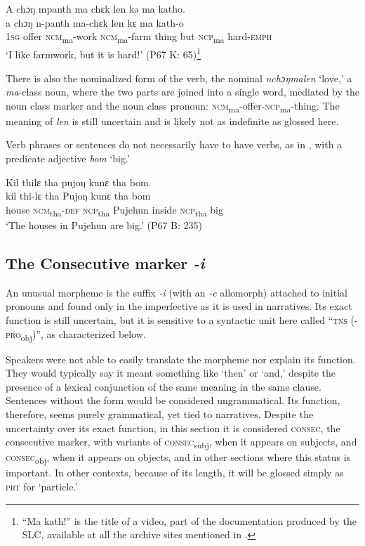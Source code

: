     \ex A chɔŋ mpanth ma chɛk len kə ma katho.\\
    \gll a    chɔŋ  n-panth      ma-chɛk      len    kɛ    ma    kath-o\\
    \textsc{1sg}  offer  \textsc{ncm}\textsubscript{ma}{}-work  \textsc{ncm}\textsubscript{ma}{}-farm  thing    but  \textsc{ncp}\textsubscript{ma}    hard-\textsc{emph}\\
    \glt ‘I like farmwork, but it is hard!' (P67 K: 65)\footnote{“Ma kath!” is the title of a video, part of the documentation produced by the SLC, available at all the archive sites mentioned in .}
\z
\z

There is also the nominalized form of the verb, the nominal \textit{nchɔŋmalen} ‘love,' a \textit{ma}{}-class noun, where the two parts are joined into a single word, mediated by the noun class marker and the noun class pronoun: \textsc{ncm}\textsubscript{ma}{}-offer-\textsc{ncp}\textsubscript{ma}{}-thing. The meaning of \textit{len} is still uncertain and is likely not as indefinite as glossed here.

Verb phrases or sentences do not necessarily have to have verbs, as in , with a predicate adjective \textit{bom} ‘big.'

\ea%
    \label{ex:202}
    Kil thilɛ tha pujoŋ kunɛ tha bom.\\
    \gll kil      thi-lɛ      tha    Pujoŋ    kunɛ    tha    bom\\
    house    \textsc{ncm}\textsubscript{tha}{}-\textsc{def}  \textsc{ncp}\textsubscript{tha}    Pujehun  inside    \textsc{ncp}\textsubscript{tha}    big\\
    \glt ‘The houses in Pujehun are big.' (P67 B: 235)
\z

\subsection{The Consecutive marker \textit{-i}}
\label{sec:8.2.1}\hypertarget{Toc115517815}{}
An unusual morpheme is the suffix \textit{{}-i} (with an \textit{{}-e} allomorph) attached to initial pronouns and found only in the imperfective as it is used in narratives. Its exact function is still uncertain, but it is sensitive to a syntactic unit here called “\textsc{tns} (\nobreakdash-\textsc{pro}\textsubscript{obj})”, as characterized below.

Speakers were not able to easily translate the morpheme nor explain its function. They would typically say it meant something like ‘then' or ‘and,' despite the presence of a lexical conjunction of the same meaning in the same clause. Sentences without the form would be considered ungrammatical. Its function, therefore, seems purely grammatical, yet tied to narratives. Despite the uncertainty over its exact function, in this section it is considered \textsc{consec}, the consecutive marker, with variants of \textsc{consec}\textsubscript{subj}, when it appears on subjects, and \textsc{consec}\textsubscript{obj}, when it appears on objects, and in other sections where this status is important. In other contexts, because of its length, it will be glossed simply as \textsc{prt} for ‘particle.'

